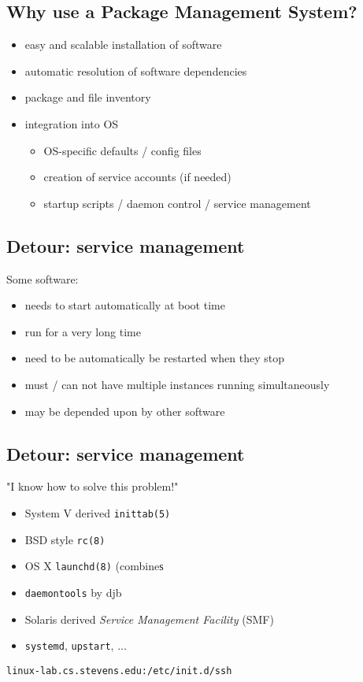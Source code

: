 \documentclass[xga]{xdvislides}
\begin{document}
\subsection{Why use a Package Management System?}
\begin{itemize}
	\item easy and scalable installation of software
	\item automatic resolution of software dependencies
	\item package and file inventory
	\item integration into OS
		\begin{itemize}
			\item OS-specific defaults / config files
			\item creation of service accounts (if needed)
			\item startup scripts / daemon control / service management
		\end{itemize}
\end{itemize}

\subsection{Detour: service management}
Some software:
\begin{itemize}
	\item needs to start automatically at boot time
	\item run for a very long time
	\item need to be automatically be restarted when they stop
	\item must / can not have multiple instances running simultaneously
	\item may be depended upon by other software
\end{itemize}

\subsection{Detour: service management}
"I know how to solve this problem!"
\begin{itemize}
	\item System V derived {\tt inittab(5)}
	\item BSD style {\tt rc(8)}
	\item OS X {\tt launchd(8)} (combineѕ
	\item {\tt daemontools} by djb
	\item Solaris derived {\em Service Management Facility} (SMF)
	\item {\tt systemd}, {\tt upstart}, ...
\end{itemize}
\vspace{.25in}
{\tt linux-lab.cs.stevens.edu:/etc/init.d/ssh}
\end{document}
